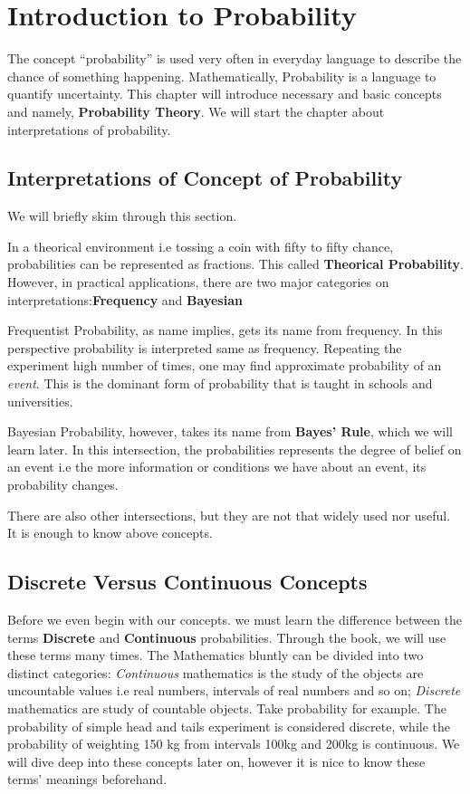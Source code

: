 \chapter{Introduction to Probability}
The concept ``probability'' is used very often in everyday language to describe the chance of something happening. Mathematically, Probability is a language to quantify uncertainty. 
This chapter will introduce necessary and basic concepts and namely, \textbf{Probability Theory}. We will start the chapter about interpretations of probability.

\section{Interpretations of Concept of Probability}
We will briefly skim through this section.
\par 
In a theorical environment i.e tossing a coin with fifty to fifty chance, probabilities can be represented  as fractions. This called \textbf{Theorical Probability}. However, in practical applications, there are two major categories on interpretations:\textbf{Frequency} and \textbf{Bayesian}
\par  
Frequentist Probability, as name implies, gets its name from frequency. In this perspective probability is interpreted same as frequency. Repeating the experiment high number of times, one may find approximate probability of an \textit{event}. 
This is the dominant form of probability that is taught in schools and universities.

\par
Bayesian Probability, however, takes its name from \textbf{Bayes' Rule}, which we will learn later. In this intersection, the probabilities represents the degree of belief on an event i.e the more information or conditions we have about an event, its probability changes.


There are also other intersections, but they are not that widely used nor useful. It is enough to know above concepts.

\section{Discrete Versus Continuous Concepts}
Before we even begin with our concepts. we must learn the difference between the terms \textbf{Discrete} and \textbf{Continuous} probabilities. Through the book, we will use these terms many times.
The Mathematics bluntly can be divided into two distinct categories: \textit{Continuous} mathematics is the study of the objects are uncountable values i.e real numbers, intervals of real numbers and so on; \textit{Discrete} mathematics are study of countable objects.
Take probability for example. The probability of simple head and tails experiment is considered discrete, while the probability of weighting 150 kg from intervals 100kg and 200kg is continuous. We will dive deep into these concepts later on, however it is nice to know these terms' meanings beforehand.

